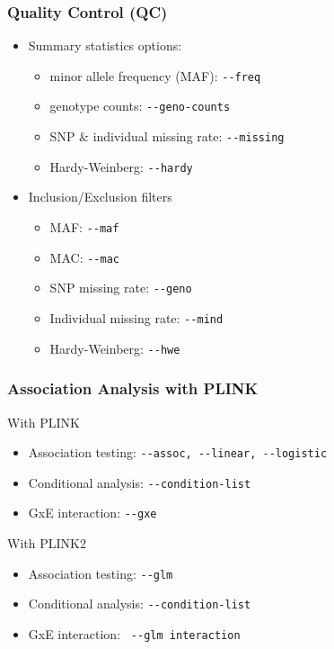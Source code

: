 \documentclass{beamer}
\begin{document}
\begin{frame}[fragile]
\frametitle{\bf Quality Control (QC)}
\begin{itemize}
\item Summary statistics options:
\begin{itemize}
\item  minor allele frequency (MAF): \verb+--freq +
\item  genotype counts: \verb+--geno-counts +
\item  SNP \&  individual missing rate:  \verb+--missing +
\item  Hardy-Weinberg:  \verb+--hardy +
\end{itemize}
\item Inclusion/Exclusion filters
\begin{itemize}
\item MAF:   \verb+--maf +
\item MAC:   \verb+--mac+
\item  SNP missing rate: \verb+--geno +
\item Individual missing rate:  \verb+--mind +
\item  Hardy-Weinberg:   \verb+--hwe +
\end{itemize}
\end{itemize}
\end{frame}



\begin{frame}[fragile]
\frametitle{\bf Association Analysis with PLINK}
With PLINK
\begin{itemize}
\item Association testing: \verb+--assoc, --linear, --logistic+
\item Conditional analysis: \verb+--condition-list+
\item GxE interaction: \verb+--gxe +
\end{itemize}
\vspace{1em}
With PLINK2
\begin{itemize}
	\item Association testing: \verb+--glm+
	\item Conditional analysis: \verb+--condition-list+
	\item GxE interaction: \verb+ --glm interaction +
\end{itemize}
\end{frame}
\end{document}
